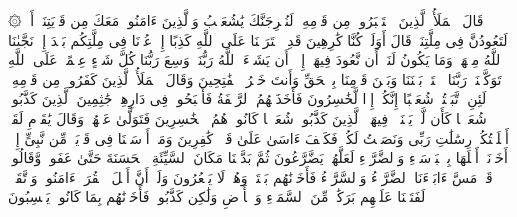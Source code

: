 ۞ قَالَ ٱلۡمَلَأُ ٱلَّذِینَ ٱسۡتَكۡبَرُوا۟ مِن قَوۡمِهِۦ لَنُخۡرِجَنَّكَ یَٰشُعَیۡبُ وَٱلَّذِینَ ءَامَنُوا۟ مَعَكَ مِن قَرۡیَتِنَاۤ أَوۡ لَتَعُودُنَّ فِی مِلَّتِنَاۚ قَالَ أَوَلَوۡ كُنَّا كَٰرِهِینَ%
\stopbuffer%
\startbuffer[\q:7:89]
قَدِ ٱفۡتَرَیۡنَا عَلَى ٱللَّهِ كَذِبًا إِنۡ عُدۡنَا فِی مِلَّتِكُم بَعۡدَ إِذۡ نَجَّىٰنَا ٱللَّهُ مِنۡهَاۚ وَمَا یَكُونُ لَنَاۤ أَن نَّعُودَ فِیهَاۤ إِلَّاۤ أَن یَشَاۤءَ ٱللَّهُ رَبُّنَاۚ وَسِعَ رَبُّنَا كُلَّ شَیۡءٍ عِلۡمًاۚ عَلَى ٱللَّهِ تَوَكَّلۡنَاۚ رَبَّنَا ٱفۡتَحۡ بَیۡنَنَا وَبَیۡنَ قَوۡمِنَا بِٱلۡحَقِّ وَأَنتَ خَیۡرُ ٱلۡفَٰتِحِینَ%
\stopbuffer%
\startbuffer[\q:7:90]
وَقَالَ ٱلۡمَلَأُ ٱلَّذِینَ كَفَرُوا۟ مِن قَوۡمِهِۦ لَئِنِ ٱتَّبَعۡتُمۡ شُعَیۡبًا إِنَّكُمۡ إِذࣰا لَّخَٰسِرُونَ%
\stopbuffer%
\startbuffer[\q:7:91]
فَأَخَذَتۡهُمُ ٱلرَّجۡفَةُ فَأَصۡبَحُوا۟ فِی دَارِهِمۡ جَٰثِمِینَ%
\stopbuffer%
\startbuffer[\q:7:92]
ٱلَّذِینَ كَذَّبُوا۟ شُعَیۡبࣰا كَأَن لَّمۡ یَغۡنَوۡا۟ فِیهَاۚ ٱلَّذِینَ كَذَّبُوا۟ شُعَیۡبࣰا كَانُوا۟ هُمُ ٱلۡخَٰسِرِینَ%
\stopbuffer%
\startbuffer[\q:7:93]
فَتَوَلَّىٰ عَنۡهُمۡ وَقَالَ یَٰقَوۡمِ لَقَدۡ أَبۡلَغۡتُكُمۡ رِسَٰلَٰتِ رَبِّی وَنَصَحۡتُ لَكُمۡۖ فَكَیۡفَ ءَاسَىٰ عَلَىٰ قَوۡمࣲ كَٰفِرِینَ%
\stopbuffer%
\startbuffer[\q:7:94]
وَمَاۤ أَرۡسَلۡنَا فِی قَرۡیَةࣲ مِّن نَّبِیٍّ إِلَّاۤ أَخَذۡنَاۤ أَهۡلَهَا بِٱلۡبَأۡسَاۤءِ وَٱلضَّرَّاۤءِ لَعَلَّهُمۡ یَضَّرَّعُونَ%
\stopbuffer%
\startbuffer[\q:7:95]
ثُمَّ بَدَّلۡنَا مَكَانَ ٱلسَّیِّئَةِ ٱلۡحَسَنَةَ حَتَّىٰ عَفَوا۟ وَّقَالُوا۟ قَدۡ مَسَّ ءَابَاۤءَنَا ٱلضَّرَّاۤءُ وَٱلسَّرَّاۤءُ فَأَخَذۡنَٰهُم بَغۡتَةࣰ وَهُمۡ لَا یَشۡعُرُونَ%
\stopbuffer%
\startbuffer[\q:7:96]
وَلَوۡ أَنَّ أَهۡلَ ٱلۡقُرَىٰۤ ءَامَنُوا۟ وَٱتَّقَوۡا۟ لَفَتَحۡنَا عَلَیۡهِم بَرَكَٰتࣲ مِّنَ ٱلسَّمَاۤءِ وَٱلۡأَرۡضِ وَلَٰكِن كَذَّبُوا۟ فَأَخَذۡنَٰهُم بِمَا كَانُوا۟ یَكۡسِبُونَ%
\stopbuffer%
